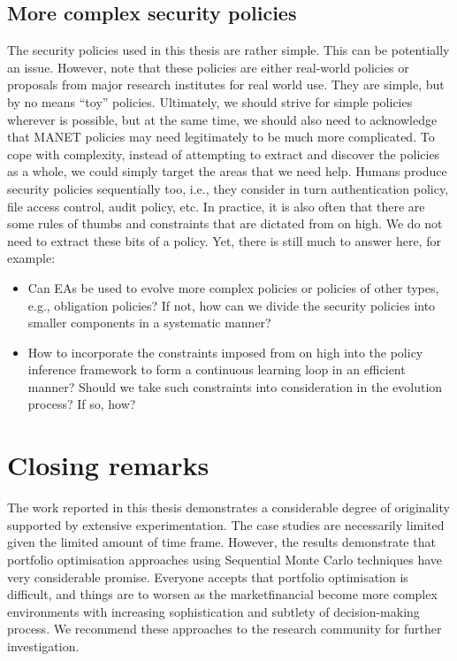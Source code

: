 \subsection{More complex security policies}
The security policies used in this thesis are rather simple. This can
be potentially an issue. However, note that these policies are either
real-world policies or proposals from major research institutes for
real world use. They are simple, but by no means ``toy''
policies. Ultimately, we should strive for simple policies wherever is
possible, but at the same time, we should also need to acknowledge
that MANET policies may need legitimately to be much more
complicated. To cope with complexity, instead of attempting to extract
and discover the policies as a whole, we could simply target the areas
that we need help. Humans produce security policies sequentially too,
i.e., they consider in turn authentication policy, file access
control, audit policy, etc. In practice, it is also often that there
are some rules of thumbs and constraints that are dictated from on
high. We do not need to extract these bits of a policy. Yet, there is
still much to answer here, for example:
\begin{itemize}
\item Can EAs be used to evolve more complex policies or policies of
  other types, e.g., obligation policies? If not, how can we divide
  the security policies into smaller components in a systematic
  manner?
\item How to incorporate the constraints imposed from on high into
  the policy inference framework to form a continuous learning loop
  in an efficient manner? Should we take such constraints into
  consideration in the evolution process? If so, how?
\end{itemize}

\section{Closing remarks}
\label{ClosingRemark}
The work reported in this thesis demonstrates a considerable degree of
originality supported by extensive experimentation. The case studies
are necessarily limited given the limited amount of time frame.  However, the results
 demonstrate that portfolio optimisation
approaches using Sequential Monte Carlo techniques have very considerable promise. Everyone accepts that portfolio optimisation is difficult, and things are to worsen as the marketfinancial become more complex environments with increasing sophistication and
subtlety of decision-making process. We recommend these approaches to
the research community for further investigation.





